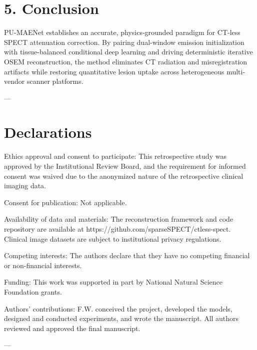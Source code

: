 \documentclass[11pt]{article}
\begin{document}
\section*{5. Conclusion}
PU-MAENet establishes an accurate, physics-grounded paradigm for CT-less SPECT attenuation correction. By pairing dual-window emission initialization with tissue-balanced conditional deep learning and driving deterministic iterative OSEM reconstruction, the method eliminates CT radiation and misregistration artifacts while restoring quantitative lesion uptake across heterogeneous multi-vendor scanner platforms.\par

---\par

\section*{Declarations}
Ethics approval and consent to participate: This retrospective study was approved by the Institutional Review Board, and the requirement for informed consent was waived due to the anonymized nature of the retrospective clinical imaging data.  \par

Consent for publication: Not applicable.  \par

Availability of data and materials: The reconstruction framework and code repository are available at https://github.com/sparseSPECT/ctless-spect. Clinical image datasets are subject to institutional privacy regulations.  \par

Competing interests: The authors declare that they have no competing financial or non-financial interests.  \par

Funding: This work was supported in part by National Natural Science Foundation grants.  \par

Authors' contributions: F.W. conceived the project, developed the models, designed and conducted experiments, and wrote the manuscript. All authors reviewed and approved the final manuscript.\par

---\par
\end{document}
